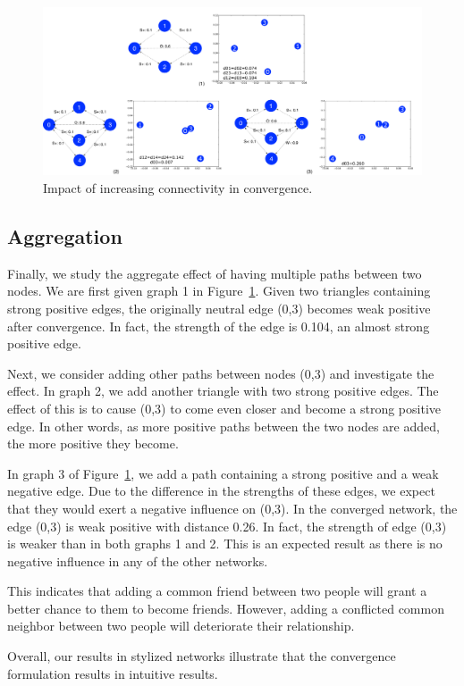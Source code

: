 \documentclass[acmtweb]{acmsmall}
\begin{document}
\begin{figure}[th]
\centering
\includegraphics[width=5.5in]{stylized3.pdf}
\caption{\label{fig:style3} Impact of increasing connectivity in convergence.}
\end{figure}

\subsection{Aggregation}
Finally, we study the aggregate effect of having multiple paths
between two nodes. We are first given graph 1 in
Figure~\ref{fig:style3}. Given two triangles containing strong
positive edges, the originally neutral edge (0,3) becomes weak
positive after convergence. In fact, the strength of the edge is
0.104, an almost strong positive edge.

Next, we consider adding other paths between nodes (0,3) and
investigate the effect. In graph 2, we add another triangle with two
strong positive edges. The effect of this is to cause (0,3) to come
even closer and become a strong positive edge. In other words, as more
positive paths between the two nodes are added, the more positive they
become.

In graph 3 of Figure~\ref{fig:style3}, we add a path containing a
strong positive and a weak negative edge. Due to the difference in the
strengths of these edges, we expect that they would exert a negative
influence on (0,3). In the converged network, the edge (0,3) is weak
positive with distance 0.26. In fact, the strength of edge (0,3) is
weaker than in both graphs 1 and 2. This is an expected result as there
is no negative influence in any of the other networks.

This indicates that adding a common friend between two people will
grant a better chance to them to become friends. However, adding a
conflicted common neighbor between two people will deteriorate their
relationship.

Overall, our results in stylized networks illustrate that the
convergence formulation results in intuitive results. 
\end{document}
